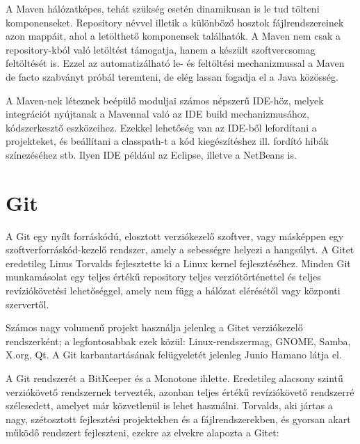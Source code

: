 \documentclass[a4paper,12pt]{report}
\begin{document}
\vspace{2mm}
A Maven hálózatképes, tehát szükség esetén dinamikusan is le tud tölteni komponenseket. Repository névvel illetik a különböző hosztok fájlrendszereinek azon mappáit, ahol a letölthető komponensek találhatók. A Maven nem csak a repository-kból való letöltést támogatja, hanem a készült szoftvercsomag feltöltését is. Ezzel az automatizálható le- és feltöltési mechanizmussal a Maven de facto szabványt próbál teremteni, de elég lassan fogadja el a Java közösség.

\vspace{2mm}
A Maven-nek léteznek beépülő moduljai számos népszerű IDE-höz, melyek integrációt nyújtanak a Mavennal való az IDE build mechanizmusához, kódszerkesztő eszközeihez. Ezekkel lehetőség van az IDE-ből lefordítani a projekteket, és beállítani a classpath-t a kód kiegészítéshez ill. fordító hibák színezéséhez stb. Ilyen IDE például az Eclipse, illetve a NetBeans is.

\newpage
\section{Git}
\label{git}

A Git egy nyílt forráskódú, elosztott verziókezelő szoftver, vagy másképpen egy szoftverforráskód-kezelő rendszer, amely a sebességre helyezi a hangsúlyt. A Gitet eredetileg Linus Torvalds fejlesztette ki a Linux kernel fejlesztéséhez. Minden Git munkamásolat egy teljes értékű repository teljes verziótörténettel és teljes revíziókövetési lehetőséggel, amely nem függ a hálózat elérésétől vagy központi szervertől.

\vspace{2mm}
Számos nagy volumenű projekt használja jelenleg a Gitet verziókezelő rendszerként; a legfontosabbak ezek közül: Linux-rendszermag, GNOME, Samba, X.org, Qt. A Git karbantartásának felügyeletét jelenleg Junio Hamano látja el.

\vspace{2mm}
A Git rendszerét a BitKeeper és a Monotone ihlette. Eredetileg alacsony szintű verziókövető rendszernek tervezték, azonban teljes értékű revíziókövető rendszerré szélesedett, amelyet már közvetlenül is lehet használni. Torvalds, aki jártas a nagy, szétosztott fejlesztési projektekben és a fájlrendszerekben, és gyorsan akart működő rendszert fejleszteni, ezekre az elvekre alapozta a Gitet:
\end{document}
